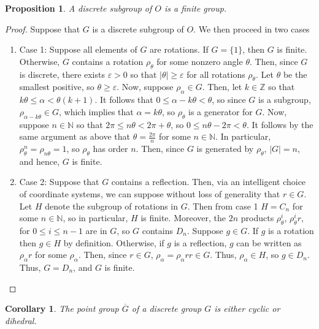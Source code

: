 \documentclass[12pt]{article}
\newtheorem{cor}[thm]{Corollary}
\newtheorem{prop}[thm]{Proposition}
\theoremstyle{definition}
\theoremstyle{remark}
\numberwithin{equation}{section}
\newcommand\Z{\mathbb Z}    %
\newcommand\N{\mathbb N}    %
\begin{document}
\begin{prop}
        A discrete subgroup of $O$ is a finite group.
\end{prop}
\begin{proof}
        Suppose that $G$ is a discrete subgroup of $O$. We then proceed in two cases \begin{enumerate}
                \item[] Case 1: Suppose all elements of $G$ are rotations. If $G = \{1\}$, then $G$ is finite. Otherwise, $G$ contains a rotation $\rho_{\theta}$ for some nonzero angle $\theta$. Then, since $G$ is discrete, there exists $\varepsilon > 0$ so that $|\theta| \geq \varepsilon$ for all rotations $\rho_{\theta}$. Let $\theta$ be the smallest positive, so $\theta \geq \varepsilon$. Now, suppose $\rho_{\alpha} \in G$. Then, let $k \in \Z$ so that $k\theta \leq \alpha < \theta(k+1)$. It follows that $0 \leq \alpha - k\theta < \theta$, so since $G$ is a subgroup, $\rho_{\alpha - k\theta} \in G$, which implies that $\alpha = k\theta$, so $\rho_{\theta}$ is a generator for $G$. Now, suppose $n \in \N$ so that $2\pi \leq n\theta < 2\pi + \theta$, so $0\leq n\theta - 2\pi < \theta$. It follows by the same argument as above that $\theta = \frac{2\pi}{n}$ for some $n \in \N$. In particular, $\rho_{\theta}^n = \rho_{n\theta} = 1$, so $\rho_{\theta}$ has order $n$. Then, since $G$ is generated by $\rho_{\theta}$, $|G| = n$, and hence, $G$ is finite.

                \item[] Case 2: Suppose that $G$ contains a reflection. Then, via an intelligent choice of coordinate systems, we can suppose without loss of generality that $r \in G$. Let $H$ denote the subgroup of rotations in $G$. Then from case 1 $H = C_n$ for some $n \in \N$, so in particular, $H$ is finite. Moreover, the $2n$ products $\rho_{\theta}^i$, $\rho_{\theta}^ir$, for $0\leq i \leq n-1$ are in $G$, so $G$ contains $D_n$. Suppose $g \in G$. If $g$ is a rotation then $g \in H$ by definition. Otherwise, if $g$ is a reflection, $g$ can be written as $\rho_{\alpha}r$ for some $\rho_{\alpha}$. Then, since $r \in G$, $\rho_{\alpha} = \rho_{\alpha}rr \in G$. Thus, $\rho_{\alpha} \in H$, so $g \in D_n$. Thus, $G = D_n$, and $G$ is finite.
        \end{enumerate}
\end{proof}

\vspace{15pt}

\begin{cor}
        The point group $\overline{G}$ of a discrete group $G$ is either cyclic or dihedral.
\end{cor}
\end{document}
